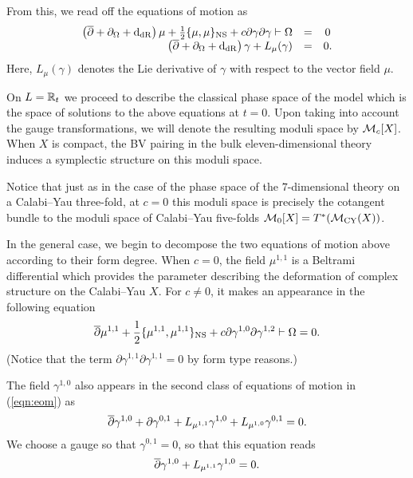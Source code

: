 \documentclass[11pt]{amsart}
\begin{document}
From this, we read off the equations of motion as
\begin{equation}\label{eqn:eom}
  \begin{array}{rccc}
    \left(\overline{\partial} + \partial_\Omega + {\rm d}_{\rm dR} \right) \mu + \frac12 \{\mu, \mu\}_{\rm NS} + c \partial \gamma \partial \gamma \vdash \Omega & = & 0 \\
    \left(\overline{\partial} + \partial_\Omega + {\rm d}_{\rm dR} \right) \gamma + L_\mu (\gamma) & = & 0 .
  \end{array}
\end{equation}
Here, $L_\mu(\gamma)$ denotes the Lie derivative of $\gamma$ with respect to the vector field $\mu$.

On $L = \mathbb R_t$ we proceed to describe the classical phase space of the model  which is the space of solutions to the above equations at $t = 0$.
Upon taking into account the gauge transformations, we will denote the resulting moduli space by $\mathcal M_c[X]$.
When $X$ is compact, the BV pairing in the bulk eleven-dimensional theory induces a symplectic structure on this moduli space.

Notice that just as in the case of the phase space of the $7$-dimensional theory on a Calabi--Yau three-fold, at $c=0$ this moduli space is precisely the cotangent bundle to the moduli space of Calabi--Yau five-folds $\mathcal M_0 [X] = T^*(\mathcal M_{\rm CY}(X))$.

In the general case, we begin to decompose the two equations of motion above according to their form degree.
When $c = 0$, the field $\mu^{1,1}$ is a Beltrami differential which provides the parameter describing the deformation of complex structure on the Calabi--Yau $X$.
For $c \ne 0$, it makes an appearance in the following equation
\begin{equation}\label{eqn:mu11}
  \overline{\partial} \mu^{1,1} + \frac12 \{\mu^{1,1}, \mu^{1,1}\}_{\rm NS} + c \partial \gamma^{1,0} \partial \gamma^{1,2} \vdash \Omega = 0 .
\end{equation}
(Notice that the term $\partial \gamma^{1,1} \partial \gamma^{1,1} = 0$ by form type reasons.)

The field $\gamma^{1,0}$ also appears in the second class of equations of motion in (\ref{eqn:eom}) as
\[
  \overline{\partial} \gamma^{1,0} + \partial \gamma^{0,1} + L_{\mu^{1,1}} \gamma^{1,0} + L_{\mu^{1,0}} \gamma^{0,1} = 0 .
\]
We choose a gauge so that $\gamma^{0,1} = 0$,  so that this equation reads
\begin{equation}\label{eqn:gamma10}
  \overline{\partial} \gamma^{1,0} + L_{\mu^{1,1}} \gamma^{1,0} = 0 .
\end{equation}
\end{document}
